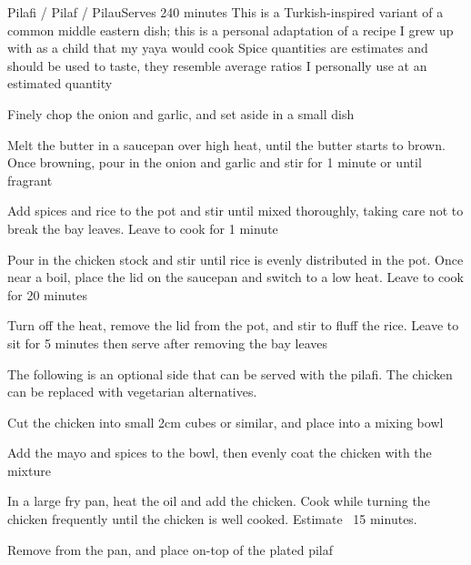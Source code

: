 \begin{recipe}{Pilafi / Pilaf / Pilau}{Serves 2}{40 minutes}
\freeform This is a Turkish-inspired variant of a common middle eastern dish; this is a personal adaptation of a recipe I grew up with as a child that my yaya would cook
\freeform Spice quantities are estimates and should be used to taste, they resemble average ratios I personally use at an estimated quantity

Finely chop the onion and garlic, and set aside in a small dish

Melt the butter in a saucepan over high heat, until the butter starts to brown. Once browning, pour in the onion and garlic and stir for 1 minute or until fragrant

Add spices and rice to the pot and stir until mixed thoroughly, taking care not to break the bay leaves. Leave to cook for 1 minute

Pour in the chicken stock and stir until rice is evenly distributed in the pot. Once near a boil, place the lid on the saucepan and switch to a low heat. Leave to cook for 20 minutes

\newstep
Turn off the heat, remove the lid from the pot, and stir to fluff the rice. Leave to sit for 5 minutes then serve after removing the bay leaves



\freeform The following is an optional side that can be served with the pilafi. The chicken can be replaced with vegetarian alternatives.

Cut the chicken into small 2cm cubes or similar, and place into a mixing bowl

Add the mayo and spices to the bowl, then evenly coat the chicken with the mixture

In a large fry pan, heat the oil and add the chicken. Cook while turning the chicken frequently until the chicken is well cooked. Estimate ~15 minutes.

\newstep
Remove from the pan, and place on-top of the plated pilaf

\end{recipe}
